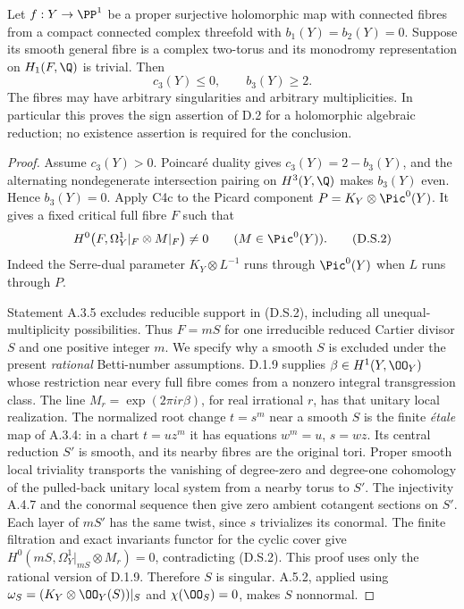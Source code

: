 \begin{theorem}
\label{st:D.2.5}
Let $f:Y\to\PP^1$ be a proper surjective holomorphic map with
connected fibres from a compact connected complex threefold with
$b_1(Y)=b_2(Y)=0$. Suppose its smooth general fibre is a complex
two-torus and its monodromy representation on $H_1(F,\Q)$ is
trivial. Then
\[
 c_3(Y)\le0,\qquad b_3(Y)\ge2.
 \tag{D.S.1}
\]
The fibres may have arbitrary singularities and arbitrary
multiplicities. In particular this proves the sign assertion of
D.2 for a holomorphic algebraic reduction; no existence assertion
is required for the conclusion.
\end{theorem}
\begin{proof}
Assume $c_3(Y)>0$. Poincar\'e duality gives
$c_3(Y)=2-b_3(Y)$, and the alternating nondegenerate intersection
pairing on $H^3(Y,\Q)$ makes $b_3(Y)$ even. Hence $b_3(Y)=0$.
Apply C4c to the Picard component
$P=K_Y\otimes\Pic^0(Y)$. It gives a fixed critical full fibre
$F$ such that
\[
 H^0\bigl(F,\Omega_Y^1|_F\otimes M|_F\bigr)\ne0
 \qquad(M\in\Pic^0(Y)).
 \tag{D.S.2}
\]
Indeed the Serre-dual parameter $K_Y\otimes L^{-1}$ runs through
$\Pic^0(Y)$ when $L$ runs through $P$.

Statement A.3.5 excludes reducible support in (D.S.2), including
all unequal-multiplicity possibilities. Thus $F=mS$ for one
irreducible reduced Cartier divisor $S$ and one positive integer
$m$. We specify why a smooth $S$ is excluded under the present
\emph{rational} Betti-number assumptions. D.1.9 supplies
$\beta\in H^1(Y,\OO_Y)$ whose restriction near every full fibre
comes from a nonzero integral transgression class. The line
$M_r=\exp(2\pi i r\beta)$, for real irrational $r$, has that
unitary local realization. The normalized root change $t=s^m$
near a smooth $S$ is the finite \emph{\'etale} map of A.3.4:
in a chart $t=uz^m$ it has equations $w^m=u$, $s=wz$.
Its central reduction $S'$ is smooth, and its nearby fibres are
the original tori. Proper smooth local triviality transports
the vanishing of degree-zero and degree-one cohomology of the
pulled-back unitary local system from a nearby torus to $S'$.
The injectivity A.4.7 and the conormal sequence then give zero
ambient cotangent sections on $S'$. Each layer of $mS'$ has the
same twist, since $s$ trivializes its conormal. The finite
filtration and exact invariants functor for the cyclic cover
give $H^0(mS,\Omega_Y^1|_{mS}\otimes M_r)=0$, contradicting
(D.S.2). This proof uses only the rational version of D.1.9.
Therefore $S$ is singular. A.5.2, applied using
$\omega_S=(K_Y\otimes\OO_Y(S))|_S$ and
$\chi(\OO_S)=0$, makes $S$ nonnormal.


\end{proof}
